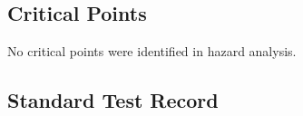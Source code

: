 \subsection{Critical Points}

No critical points were identified in hazard analysis.














\subsection{Standard Test Record}

